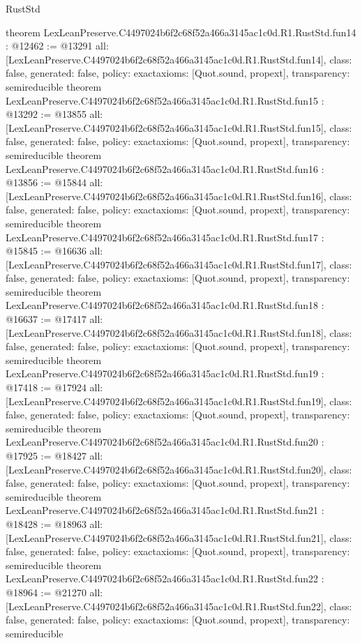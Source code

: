 \begin{lexlean}{RustStd}
\begin{coremodule}
{}
theorem LexLeanPreserve.C4497024b6f2c68f52a466a3145ac1c0d.R1.RustStd.fun14 : @12462 := @13291 {
  all: [LexLeanPreserve.C4497024b6f2c68f52a466a3145ac1c0d.R1.RustStd.fun14],
  class: false,
  generated: false,
  policy: exact{axioms: [Quot.sound, propext]},
  transparency: semireducible
}
theorem LexLeanPreserve.C4497024b6f2c68f52a466a3145ac1c0d.R1.RustStd.fun15 : @13292 := @13855 {
  all: [LexLeanPreserve.C4497024b6f2c68f52a466a3145ac1c0d.R1.RustStd.fun15],
  class: false,
  generated: false,
  policy: exact{axioms: [Quot.sound, propext]},
  transparency: semireducible
}
theorem LexLeanPreserve.C4497024b6f2c68f52a466a3145ac1c0d.R1.RustStd.fun16 : @13856 := @15844 {
  all: [LexLeanPreserve.C4497024b6f2c68f52a466a3145ac1c0d.R1.RustStd.fun16],
  class: false,
  generated: false,
  policy: exact{axioms: [Quot.sound, propext]},
  transparency: semireducible
}
theorem LexLeanPreserve.C4497024b6f2c68f52a466a3145ac1c0d.R1.RustStd.fun17 : @15845 := @16636 {
  all: [LexLeanPreserve.C4497024b6f2c68f52a466a3145ac1c0d.R1.RustStd.fun17],
  class: false,
  generated: false,
  policy: exact{axioms: [Quot.sound, propext]},
  transparency: semireducible
}
theorem LexLeanPreserve.C4497024b6f2c68f52a466a3145ac1c0d.R1.RustStd.fun18 : @16637 := @17417 {
  all: [LexLeanPreserve.C4497024b6f2c68f52a466a3145ac1c0d.R1.RustStd.fun18],
  class: false,
  generated: false,
  policy: exact{axioms: [Quot.sound, propext]},
  transparency: semireducible
}
theorem LexLeanPreserve.C4497024b6f2c68f52a466a3145ac1c0d.R1.RustStd.fun19 : @17418 := @17924 {
  all: [LexLeanPreserve.C4497024b6f2c68f52a466a3145ac1c0d.R1.RustStd.fun19],
  class: false,
  generated: false,
  policy: exact{axioms: [Quot.sound, propext]},
  transparency: semireducible
}
theorem LexLeanPreserve.C4497024b6f2c68f52a466a3145ac1c0d.R1.RustStd.fun20 : @17925 := @18427 {
  all: [LexLeanPreserve.C4497024b6f2c68f52a466a3145ac1c0d.R1.RustStd.fun20],
  class: false,
  generated: false,
  policy: exact{axioms: [Quot.sound, propext]},
  transparency: semireducible
}
theorem LexLeanPreserve.C4497024b6f2c68f52a466a3145ac1c0d.R1.RustStd.fun21 : @18428 := @18963 {
  all: [LexLeanPreserve.C4497024b6f2c68f52a466a3145ac1c0d.R1.RustStd.fun21],
  class: false,
  generated: false,
  policy: exact{axioms: [Quot.sound, propext]},
  transparency: semireducible
}
theorem LexLeanPreserve.C4497024b6f2c68f52a466a3145ac1c0d.R1.RustStd.fun22 : @18964 := @21270 {
  all: [LexLeanPreserve.C4497024b6f2c68f52a466a3145ac1c0d.R1.RustStd.fun22],
  class: false,
  generated: false,
  policy: exact{axioms: [Quot.sound, propext]},
  transparency: semireducible
}
\end{coremodule}
\end{lexlean}
